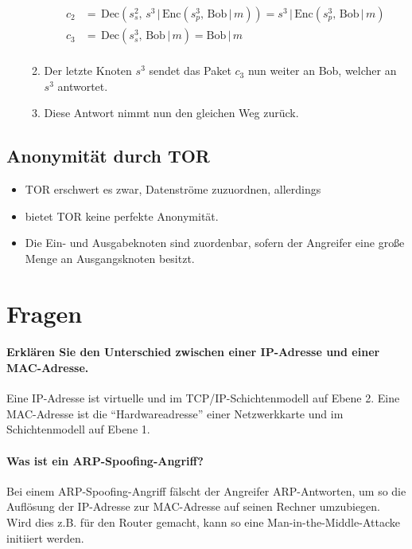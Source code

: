 \documentclass[a4paper, 11pt, accentcolor = tud3b]{tudreport}
\newcommand{\Enc}{\ensuremath{\textrm{Enc}}}
\newcommand{\Dec}{\ensuremath{\textrm{Dec}}}
\begin{document}
\begin{itemize}
\begin{enumerate}
\begin{align*}
				                	c_2 &=\, \Dec(s^2_s,\, s^3 \,\vert\, \Enc(s^3_p,\, \text{Bob} \,\vert\, m)) = s^3 \,\vert\, \Enc(s^3_p,\, \text{Bob} \,\vert\, m) \\
				                	c_3 &=\, \Dec(s^3_s,\, \text{Bob} \,\vert\, m) = \text{Bob} \,\vert\, m \\
			                	\end{align*}
			                \item Der letzte Knoten \(s^3\) sendet das Paket \(c_3\) nun weiter an Bob, welcher an \(s^3\) antwortet.
			                \item Diese Antwort nimmt nun den gleichen Weg zurück.
	                	\end{enumerate}
                \end{itemize}

            \subsection{Anonymität durch TOR}
                \begin{itemize}
                	\item TOR erschwert es zwar, Datenströme zuzuordnen, allerdings
                	\item bietet TOR keine perfekte Anonymität.
                	\item Die Ein- und Ausgabeknoten sind zuordenbar, sofern der Angreifer eine große Menge an Ausgangsknoten besitzt.
                \end{itemize}

        \section{Fragen}
			\paragraph{Erklären Sie den Unterschied zwischen einer IP-Adresse und einer MAC-Adresse.}
			Eine IP-Adresse ist virtuelle und im TCP/IP-Schichtenmodell auf Ebene 2. Eine MAC-Adresse ist die \enquote{Hardwareadresse} einer Netzwerkkarte und im Schichtenmodell auf Ebene 1.
			
			\paragraph{Was ist ein ARP-Spoofing-Angriff?}
			Bei einem ARP-Spoofing-Angriff fälscht der Angreifer ARP-Antworten, um so die Auflösung der IP-Adresse zur MAC-Adresse auf seinen Rechner umzubiegen. Wird dies z.B. für den Router gemacht, kann so eine Man-in-the-Middle-Attacke initiiert werden.
			
\end{document}
